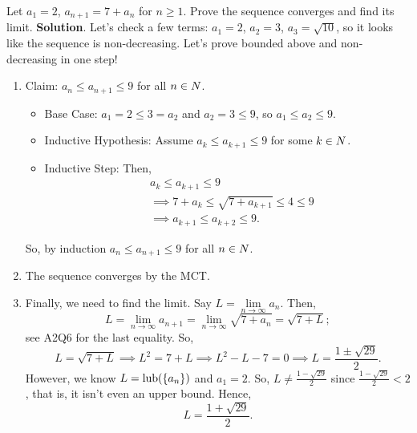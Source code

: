 \begin{Example}{}{}
    Let $ a_1=2 $, $ a_{n+1}=7+a_n $ for $ n\ge 1 $. Prove
    the sequence converges and find its limit.
    \tcblower{}
    \textbf{Solution}. Let's check a few terms: $ a_1=2 $, $ a_2=3 $, $ a_3=\sqrt{10} $,
    so it looks like the sequence is non-decreasing. Let's prove
    bounded above and non-decreasing in one step!
    \begin{enumerate}[(1)]
        \item Claim: $ a_n\le a_{n+1}\le 9 $ for all $ n\in \relax{N} $.
              \begin{itemize}
                  \item Base Case: $ a_1=2\le 3=a_2 $ and $ a_2=3\le 9 $,
                        so $ a_1\le a_2\le 9 $.
                  \item Inductive Hypothesis: Assume
                        $ a_k\le a_{k+1}\le 9 $ for some $ k\in \relax{N} $.
                  \item Inductive Step: Then,
                        \begin{align*}
                             & a_k\le a_{k+1}\le 9                          \\
                             & \implies 7+a_k\le \sqrt{7+a_{k+1}}\le 4\le 9 \\
                             & \implies a_{k+1}\le a_{k+2}\le 9.
                        \end{align*}
              \end{itemize}
              So, by induction $ a_n\le a_{n+1}\le 9 $ for all $ n\in \relax{N} $.
        \item The sequence converges by the MCT\@.
        \item Finally, we need to find the limit. Say $ L=\lim\limits_{{n} \to {\infty}}a_n $.
              Then,
              \[ L=\lim\limits_{{n} \to {\infty}}a_{n+1}=\lim\limits_{{n} \to {\infty}}\sqrt{7+a_n}=\sqrt{7+L}; \]
              see A2Q6 for the last equality. So,
              \[ L=\sqrt{7+L}\implies L^2=7+L\implies L^2-L-7=0\implies L=\frac{1\pm \sqrt{29}}{2}. \]
              However, we know $ L=\text{lub}(\{a_n\}) $ and $ a_1=2 $. So, $ L\ne \frac{1-\sqrt{29}}{2} $
              since $ \frac{1-\sqrt{29}}{2}<2 $, that is, it isn't even an upper bound. Hence,
              \[ L=\frac{1+\sqrt{29}}{2}. \]
    \end{enumerate}
\end{Example}
